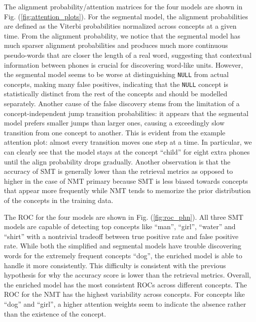 \documentclass[journal]{IEEEtran}
\begin{document}
The alignment probability/attention matrices for the four models are shown in Fig. (\ref{fig:attention_plots}). For the segmental model, the alignment probabilities are defined as the Viterbi probabilities normalized across concepts at a given time.  From the alignment probability, we notice that the segmental model has much sparser alignment probabilities and produces much more continuous pseudo-words that are closer the length of a real word, suggesting that contextual information between phones is crucial for discovering word-like units. However, the segmental model seems to be worse at distinguishing \texttt{NULL} from actual concepts, making many false positives, indicating that the \texttt{NULL} concept is statistically distinct from the rest of the concepts and should be modelled separately. Another cause of the false discovery stems from the limitation of a concept-independent jump transition probabilities: it appears that the segmental model prefers smaller jumps than larger ones, causing a exceedingly slow transition from one concept to another. This is evident from the example attention plot: almost every transition moves one step at a time. In particular, we can clearly see that the model stays at the concept ``child'' for eight extra phones until the align probability drops gradually. Another observation is that the accuracy of SMT is generally lower than the retrieval metrics as opposed to higher in the case of NMT primary because SMT is less biased towards concepts that appear more frequently while NMT tends to memorize the prior distribution of the concepts in the training data.

The ROC for the four models are shown in Fig. (\ref{fig:roc_phn}). All three SMT models are capable of detecting top concepts like ``man'', ``girl'', ``water'' and ``shirt'' with a nontrivial tradeoff between true positive rate and false positive rate. While both the simplified and segmental models have trouble discovering words for the extremely frequent concepts ``dog'', the enriched model is able to handle it more consistently. This difficulty is consistent with the previous hypothesis for why the accuracy score is lower than the retrieval metrics. Overall, the enriched model has the most consistent ROCs across different concepts. The ROC for the NMT has the highest variability across concepts. For concepts like ``dog'' and ``girl'', a higher attention weights seem to indicate the absence rather than the existence of the concept.    
\end{document}
